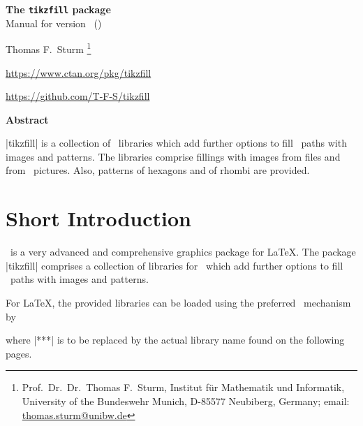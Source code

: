 \documentclass[a4paper,11pt]{article}
\begin{document}
\begin{center}
\begin{tcolorbox}[enhanced,hbox,tikznode,left=8mm,right=8mm,boxrule=0.4pt,
  colback=white,colframe=black!50!yellow,
  drop lifted shadow=black!50!yellow,arc is angular,
  before=\par\vspace*{5mm},after=\par\bigskip]
{\bfseries\LARGE The \texttt{tikzfill} package}\\[3mm]
{\large Manual for version \version\ (\datum)}
\end{tcolorbox}
{\large Thomas F.~Sturm%
  \footnote{Prof.~Dr.~Dr.~Thomas F.~Sturm, Institut f\"{u}r Mathematik und Informatik,
    University of the Bundeswehr Munich, D-85577 Neubiberg, Germany;
     email: \href{mailto:thomas.sturm@unibw.de}{thomas.sturm@unibw.de}}\par\medskip
\normalsize\url{https://www.ctan.org/pkg/tikzfill}\par
\url{https://github.com/T-F-S/tikzfill}
}
\end{center}
\bigskip
\begin{absquote}
  \begin{center}\bfseries Abstract\end{center}
  |tikzfill| is a collection of \tikzname\ libraries which add further
  options to fill \tikzname\ paths with images and patterns.
  The libraries comprise fillings with images from files and from \tikzname\ pictures.
  Also, patterns of hexagons and of rhombi are provided.
\end{absquote}

\clearpage
\tableofcontents


\clearpage
\section{Short Introduction}\label{sec:intro}

\tikzname\ is a very advanced and comprehensive graphics package for \LaTeX.
The package |tikzfill| comprises a collection of libraries for \tikzname\, which
add further options to fill \tikzname\ paths with images and patterns.

For \LaTeX, the provided libraries can be loaded using the preferred
\tikzname\ mechanism by
\begin{dispListing*}{}
\usetikzlibrary{fill.***} %
\end{dispListing*}
where |***| is to be replaced by the actual library name found on the following pages.
\end{document}
